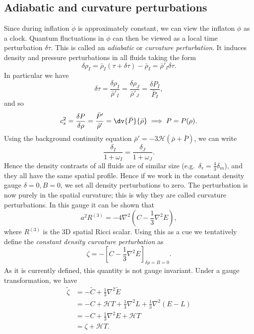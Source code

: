 \documentclass{jknotes}
\begin{document}
\subsection{Adiabatic and curvature perturbations}
Since during inflation \(\dot\phi\) is approximately constant, we can view the inflaton \(\phi\) as a clock. Quantum fluctuations in \(\phi\) can then be viewed as a local time perturbation \(\delta \tau\). This is called an \emph{adiabatic} or \emph{curvature perturbation}. It induces density and pressure perturbations in all fluids taking the form
\begin{equation}
    \delta \rho_I = \bar\rho_I(\tau+\delta\tau) - \bar\rho_I = \bar\rho'_I\delta \tau.
\end{equation}
In particular we have
\begin{equation}
    \delta\tau = \frac{\delta\rho_I}{\bar\rho'_I} = \frac{\delta\rho_J}{\bar\rho'_J} = \frac{\delta P_I}{\bar{P}_I},
\end{equation}
and so
\begin{equation}
    c_s^2 = \frac{\delta P}{\delta\rho} = \frac{\bar{P}'}{\bar{\rho}'} = \dv{\bar{P}}{\bar\rho} \implies P = P(\rho).
\end{equation}
Using the background continuity equation \(\bar\rho' = -3\mathcal{H}(\bar\rho+\bar P)\), we can write
\begin{equation}
    \frac{\delta_I}{1+\omega_I} = \frac{\delta_J}{1+\omega_J}.
\end{equation}
Hence the density contrasts of all fluids are of similar size (e.g.\ \(\delta_r = \frac43\delta_m\)), and they all have the same spatial profile. Hence if we work in the constant density gauge \(\delta=0, B=0\), we set all density perturbations to zero. The perturbation is now purely in the spatial curvature; this is why they are called curvature perturbations. In this gauge it can be shown that
\begin{equation}
    a^2 R^{(3)} = -4\nabla^2\left(C-\frac13\nabla^2 E\right),
\end{equation}
where \(R^{(3)}\) is the 3D spatial Ricci scalar. Using this as a cue we tentatively define the \emph{constant density curvature perturbation} as
\begin{equation}
    \zeta = - \left[C-\frac13\nabla^2E\right]_{\delta\rho=B=0}.
\end{equation}
As it is currently defined, this quantity is not gauge invariant. Under a gauge transformation, we have
\begin{align}
    \tilde\zeta &= -\tilde{C} + \frac13\nabla^2\tilde{E}\\
                &= -C + \mathcal{H}T + \frac13\nabla^2L + \frac13\nabla^2(E-L)\\
                &= -C + \frac13\nabla^2E + \mathcal{H}T \\
                &= \zeta + \mathcal{H}T.
\end{align}
\end{document}
